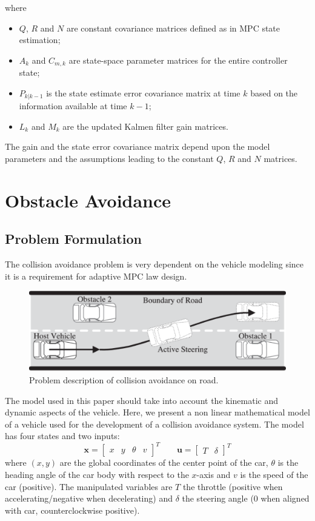 \documentclass[conference, 11pt]{IEEEtran}
\begin{document}
where 
\begin{itemize}
 \item $Q$, $R$ and $N$ are constant covariance matrices defined as in MPC state estimation;
 \item $A_k$ and $C_{m,k}$ are state-space parameter matrices for the entire controller state;
 \item $P_{k|k-1}$ is the state estimate error covariance matrix at time $k$ based on the information available at time $k-1$;
 \item $L_k$ and $M_k$ are the updated Kalmen filter gain matrices.
\end{itemize}
The gain and the state error covariance matrix depend upon the model parameters
and the assumptions leading to the constant $Q$, $R$ and $N$ matrices.


\section{Obstacle Avoidance}
\subsection{Problem Formulation}
The collision avoidance problem is very dependent on the vehicle modeling since it is a requirement for  adaptive MPC law design. 
\begin{figure}[!h]
	\centering
	\includegraphics[width=1\columnwidth]{./figure/obstacleAvoidance.pdf}
	\caption{Problem description of collision avoidance on road.}
	\label{fig:obstacleAvoidance}
\end{figure}

The model used in this paper should take into account the kinematic and dynamic aspects of the vehicle. Here, we present a non linear mathematical model of a vehicle used for the development of a collision avoidance system.
The model has four states and two inputs:
\[ 
\textbf{x}=\begin{bmatrix}
   x&y&\theta&v 
  \end{bmatrix}^{T}
\qquad 
\textbf{u}=\begin{bmatrix}
T&\delta 
\end{bmatrix}^{T}
\]
where $(x,y)$ are the global coordinates of the center point of the car, $\theta$ is the heading angle of the car body with respect to the $x$-axis and $v$ is the speed of the car (positive). The manipulated variables are $T$ the throttle (positive when accelerating/negative when decelerating) and $\delta$ the steering angle ($0$ when aligned with car, counterclockwise positive).
\end{document}
